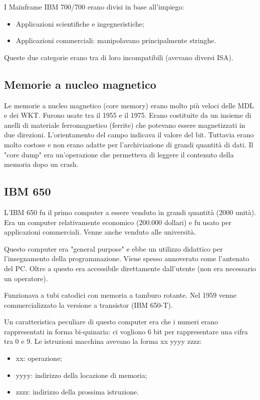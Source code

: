 
I Mainframe IBM 700/700 erano divisi in base all'impiego:

\begin{itemize}
    \item Applicazioni scientifiche e ingegneristiche;
    \item Applicazioni commerciali: manipolavano principalmente stringhe.
\end{itemize}

Queste due categorie erano tra di loro incompatibili (avevano diversi ISA).

\subsection{Memorie a nucleo magnetico}

Le memorie a nucleo magnetico (core memory) erano molto più veloci delle MDL e dei WKT.
Furono usate tra il 1955 e il 1975. Erano costituite da un insieme di anelli di materiale
ferromagnetico (ferrite) che potevano essere magnetizzati in due direzioni. L'orientamento
del campo indicava il valore del bit. Tuttavia erano molto costose e non erano adatte per
l'archiviazione di grandi quantità di dati.
Il "core dump" era un'operazione che permetteva di leggere il contenuto della memoria dopo
un crash.

\subsection{IBM 650}

L'IBM 650 fu il primo computer a essere venduto in grandi quantità (2000 unità). Era un
computer relativamente economico (200.000 dollari) e fu usato per applicazioni commerciali.
Venne anche venduto alle università.

Questo computer era "general purpose" e ebbe un utilizzo didattico per l'insegnamento
della programmazione. Viene spesso annoverato come l'antenato del PC. Oltre a questo era
accessibile direttamente dall'utente (non era necessario un operatore).

Funzionava a tubi catodici con memoria a tamburo rotante. Nel 1959 venne commercializzato
la versione a transistor (IBM 650-T).

Un caratteristica peculiare di questo computer era che i numeri erano rappresentati in 
forma bi-quinaria: ci vogliono 6 bit per rappresentare una cifra tra 0 e 9. Le istruzioni macchina
avevano la forma xx yyyy zzzz:

\begin{itemize}
    \item xx: operazione;
    \item yyyy: indirizzo della locazione di memoria;
    \item zzzz: indirizzo della prossima istruzione.
\end{itemize}




